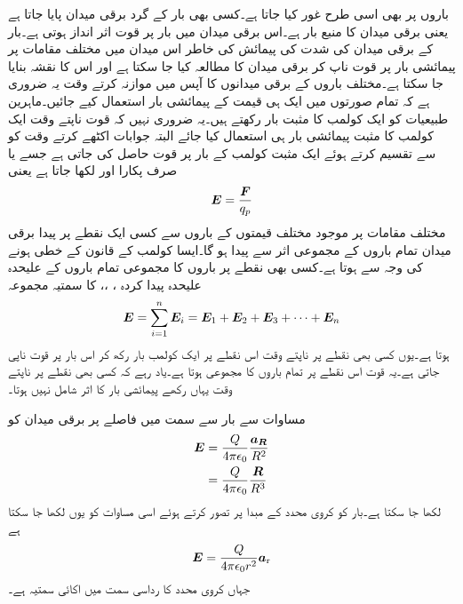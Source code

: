 باروں پر بھی اسی طرح غور کیا جاتا ہے۔کسی بھی بار  کے گرد برقی میدان پایا جاتا ہے یعنی برقی میدان کا منبع بار ہے۔اس برقی میدان میں بار پر قوت اثر انداز ہوتی ہے۔بار  کے برقی میدان کی شدت کی پیمائش کی خاطر اس میدان میں مختلف مقامات پر پیمائشی بار   پر قوت  ناپ کر برقی میدان کا مطالعہ کیا جا سکتا ہے اور اس کا نقشہ بنایا جا سکتا ہے۔مختلف باروں کے برقی میدانوں کا آپس میں موازنہ کرتے وقت یہ ضروری ہے کہ تمام صورتوں میں ایک ہی قیمت کے پیمائشی بار  استعمال کیے جائیں۔ماہرین طبیعیات  کو ایک کولمب کا مثبت بار  رکھتے ہیں۔یہ ضروری نہیں کہ قوت ناپتے وقت ایک کولمب کا مثبت پیمائشی بار ہی استعمال کیا جائے البتہ جوابات اکٹھے کرتے وقت  کو  سے تقسیم کرتے ہوئے ایک مثبت کولمب کے بار پر قوت حاصل کی جاتی ہے جسے  یا صرف  پکارا اور  لکھا جاتا ہے یعنی
\begin{align}\label{مساوات_کولمب_برقی_شدت_اور_قوت}
{\ensuremath{{\boldsymbol{E}}}}=\frac{{{\boldsymbol{F}}}}{q_p}
\end{align}
مختلف مقامات پر موجود مختلف قیمتوں کے باروں سے کسی ایک نقطے پر  پیدا برقی میدان  تمام باروں کے مجموعی اثر سے پیدا ہو گا۔ایسا کولمب کے قانون کے خطی ہونے کی وجہ سے  ہوتا ہے۔کسی بھی نقطے پر  باروں کا مجموعی  تمام باروں کے علیحدہ علیحدہ پیدا کردہ  ،  ،،  کا سمتیہ مجموعہ
\begin{align}
{\ensuremath{{\boldsymbol{E}}}}=\sum_{i=1}^n {{\boldsymbol{E}}}_i={{\boldsymbol{E}}_{\textup{1}}}+{{\boldsymbol{E}}_{\textup{2}}}+{{\boldsymbol{E}}_{\textup{3}}}+\cdots+{{\boldsymbol{E}}}_n 
\end{align}
 ہوتا ہے۔یوں کسی بھی نقطے   پر  ناپتے وقت اس نقطے پر ایک کولمب بار  رکھ کر اس بار پر قوت ناپی جاتی ہے۔یہ قوت اس نقطے پر تمام باروں کا مجموعی   ہوتا ہے۔یاد رہے کہ کسی بھی نقطے پر   ناپتے وقت یہاں رکھے پیمائشی بار  کا اثر شامل نہیں ہوتا۔

مساوات   سے  بار  سے  سمت میں  فاصلے پر برقی میدان کو
\begin{gather}
\begin{aligned}\label{مساوات_کولمب_قوت_کی_عمومی_مساوات}
{\ensuremath{{\boldsymbol{E}}}}&=\frac{Q}{4 \pi \epsilon_0}\frac{{{\boldsymbol{a_{R}}}}}{ R^2}\\
&=\frac{Q}{4 \pi \epsilon_0}\frac{{{\boldsymbol{R}}}}{ R^3}
\end{aligned}
\end{gather}
لکھا جا سکتا ہے۔بار کو کروی محدد کے مبدا پر تصور کرتے ہوئے اسی مساوات کو یوں لکھا جا سکتا ہے
\begin{align}\label{مساوات_کولمب_نقطہ_بار_کروی_رداس_پر_تبدیل_نہیں_ہوتا}
{\ensuremath{{\boldsymbol{E}}}}=\frac{Q}{4 \pi \epsilon_0 r^2} {\boldsymbol{a}}_{\textup{r}}
\end{align}
جہاں    کروی محدد کا رداسی سمت میں اکائی سمتیہ ہے۔

